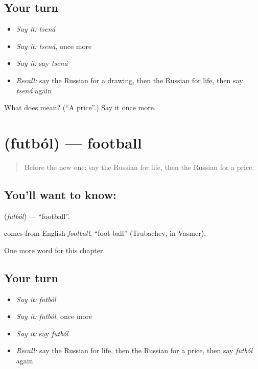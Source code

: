 \subsection*{Your turn}
\begin{itemize}
\raggedright
  \item \emph{Say it:} \emph{tsená}
  \item \emph{Say it:} \emph{tsená}, once more
  \item \emph{Say it:} say \emph{tsená}
  \item \emph{Recall:} say the Russian for a drawing, then the Russian for life, then say \emph{tsená} again
\end{itemize}

\begin{tcolorbox}[breakable,colback=teal!4,colframe=teal!35!black,title={Before you move on}]
What does  mean? (\textquotedblleft{}A price\textquotedblright{}.) Say it once more.
\end{tcolorbox}
\section[\texorpdfstring{\ru{футбол} (futból)}{футбол (futból)}]{ (futból) — football}

\label{lesson:RU-C114-football}



\begin{quote}
Before the new one: say the Russian for life, then the Russian for a price.
\end{quote}

\subsection*{You'll want to know: }
\textbf{} (\emph{futból}) — \textquotedblleft{}football\textquotedblright{}.

\begin{cousinweb}
\textbf{} comes from English \emph{football}, \textquotedblleft{}foot ball\textquotedblright{} (Trubachev, in Vasmer).
\end{cousinweb}

\begin{grammarlens}[title={What you've built}]
One more word for this chapter.
\end{grammarlens}

\subsection*{Your turn}
\begin{itemize}
\raggedright
  \item \emph{Say it:} \emph{futból}
  \item \emph{Say it:} \emph{futból}, once more
  \item \emph{Say it:} say \emph{futból}
  \item \emph{Recall:} say the Russian for life, then the Russian for a price, then say \emph{futból} again
\end{itemize}

